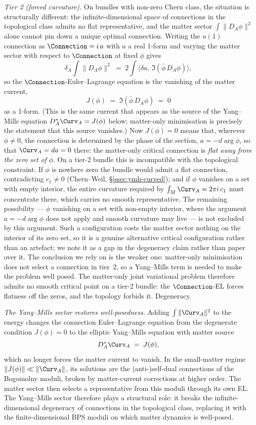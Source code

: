 \begin{remark}
\emph{Tier 2 (forced curvature).} On bundles with non-zero Chern
class, the situation is structurally different: the
infinite-dimensional space of connections in the topological class
admits no flat representative, and the matter sector
$\int\|D_A\phi\|^2$ alone cannot pin down a unique optimal
connection. Writing the $u(1)$ connection as $\Connection=i\,a$ with
$a$ a real 1-form and varying the matter sector with respect to
$\Connection$ at fixed $\phi$ gives
\[
   \delta_A\int\|D_A\phi\|^2
   \;=\; 2\int\bigl\langle\delta a,\,\Im(\bar\phi\,D_A\phi)\bigr\rangle,
\]
so the $\Connection$-Euler--Lagrange equation is the vanishing of the
matter current,
\[
   J(\phi)\;=\;\Im(\bar\phi\,D_A\phi)\;=\;0
\]
as a 1-form. (This is the same current that appears as the source of
the Yang--Mills equation $D_A^*\Curv_A=J(\phi)$ below; matter-only
minimisation is precisely the statement that this source vanishes.)
Now $J(\phi)=0$ means that, wherever $\phi\neq 0$, the connection is
determined by the phase of the section, $a=-d\arg\phi$, so that
$\Curv_A=da=0$ there: the matter-only critical connection is
\emph{flat away from the zero set of $\phi$}. On a tier-2 bundle
this is incompatible with the topological constraint. If $\phi$ is
nowhere zero the bundle would admit a flat connection, contradicting
$c_1\neq 0$ (Chern--Weil, \S\ref{ssec:ymh-curved}); and if $\phi$
vanishes on a set with empty interior, the entire curvature required
by $\int_M\Curv_A=2\pi i\,c_1$ must concentrate there, which carries
no smooth representative. The remaining possibility --- $\phi$
vanishing on a set with non-empty interior, where the argument
$a=-d\arg\phi$ does not apply and smooth curvature may live --- is
not excluded by this argument. Such a configuration costs the matter
sector nothing on the interior of its zero set, so it is a genuine
alternative critical configuration rather than an artefact; we note
it as a gap in the degeneracy claim rather than paper over it. The
conclusion we rely on is the weaker one: matter-only minimisation
does not select a connection in tier~2, so a Yang--Mills term is
needed to make the problem well posed. The matter-only joint variational problem therefore
admits no smooth critical point on a tier-2 bundle: the
$\Connection$-EL forces flatness off the zeros, and the topology
forbids it. Degeneracy.

\emph{The Yang--Mills sector restores well-posedness.} Adding
$\int\|\Curv_A\|^2$ to the energy changes the connection
Euler--Lagrange equation from the degenerate condition
$J(\phi)=0$ to the elliptic Yang--Mills equation with matter source
\[
   D_A^*\Curv_A \;=\; J(\phi),
\]
which no longer forces the matter current to vanish. In the small-matter regime
$\|J(\phi)\|\ll\|\Curv_A\|$, its solutions are the (anti-)self-dual
connections of the Bogomolny moduli, broken by matter-current
corrections at higher order. The matter sector then selects a
representative from this moduli through its own EL. The Yang--Mills
sector therefore plays a structural role: it breaks the
infinite-dimensional degeneracy of connections in the topological
class, replacing it with the finite-dimensional BPS moduli on which
matter dynamics is well-posed.


\end{remark}
